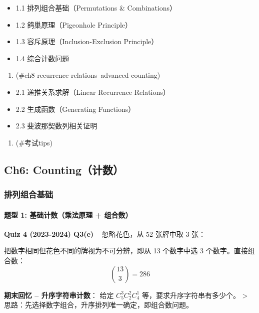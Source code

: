 \documentclass[10pt,a4paper,openany]{ctexbook}
\theoremstyle{definition}
\theoremstyle{remark}
\renewenvironment{quote}
  {\list{}{\leftmargin=1em\rightmargin=0pt\topsep=0.5pt\partopsep=0pt}\item[]}
  {\endlist}
\begin{document}
\begin{itemize}
\item 1.1 排列组合基础（Permutations \& Combinations）
\item 1.2 鸽巢原理（Pigeonhole Principle）
\item 1.3 容斥原理（Inclusion-Exclusion Principle）
\item 1.4 综合计数问题
\end{itemize}

\begin{enumerate}
\item [Ch8: Recurrence Relations \& Advanced Counting](\#ch8-recurrence-relations--advanced-counting)
\end{enumerate}

\begin{itemize}
\item 2.1 递推关系求解（Linear Recurrence Relations）
\item 2.2 生成函数（Generating Functions）
\item 2.3 斐波那契数列相关证明
\end{itemize}

\begin{enumerate}
\item [考试Tips](\#考试tips)

\end{enumerate}

\vspace{-2pt}

\subsection{Ch6: Counting（计数）}

\subsubsection{排列组合基础}

\paragraph{题型 1: 基础计数（乘法原理 + 组合数）}

\textbf{Quiz 4 (2023-2024) Q3(e)} -- 忽略花色，从 52 张牌中取 3 张：
\begin{quote}
把数字相同但花色不同的牌视为不可分辨，即从 13 个数字中选 3 个数字。直接组合数：
\[
 \binom{13}{3} = 286 
\]


\textbf{期末回忆 -- 升序字符串计数}：
给定 $C_5^3 C_2^2 C_4^1$ 等，要求升序字符串有多少个。
>
思路：先选择数字组合，升序排列唯一确定，即组合数问题。

\end{quote}
\end{document}
